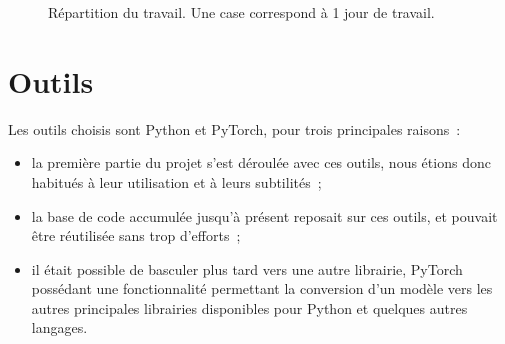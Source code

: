 \begin{figure}[ht]
	\centering
	\caption[Répartition du travail]{Répartition du travail. Une case correspond à 1 jour de travail.}\label{fig:papud_time}
\end{figure}

\section{Outils}
Les outils choisis sont Python et PyTorch, pour trois principales raisons~:
\begin{itemize}
	\item la première partie du projet s'est déroulée avec ces outils, nous étions donc habitués à leur utilisation et à leurs subtilités~;
	\item la base de code accumulée jusqu'à présent reposait sur ces outils, et pouvait être réutilisée sans trop d'efforts~;
	\item il était possible de basculer plus tard vers une autre librairie, PyTorch possédant une fonctionnalité permettant la conversion d'un modèle vers les autres principales librairies disponibles pour Python et quelques autres langages.
\end{itemize}
